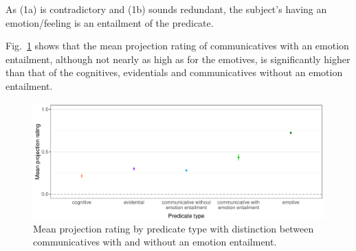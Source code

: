 \documentclass[11pt,fleqn]{article}
\newcommand{\figref}[1]{Fig.~\ref{#1}}
\newcommand{\6}{\mbox{$[\hspace*{-.6mm}[$}}
\newcommand{\9}{\mbox{$]\hspace*{-.6mm}]$}}
\begin{document}
\begin{exe}
	\ex
	\begin{xlist}
	\end{xlist}
\end{exe}
As (1a) is contradictory and (1b) sounds redundant, the subject’s having an emotion/feeling is an entailment of the predicate.

\figref{projpredtype2} shows that the mean projection rating of communicatives with an emotion entailment, although not nearly as high as for the emotives, is significantly higher than that of the cognitives, evidentials and communicatives without an emotion entailment.

\begin{figure}[H]
	\centering
	\includegraphics[width=1\textwidth]{projection-by-predicateType2}
	\caption{Mean projection rating by predicate type with distinction between communicatives with and without an emotion entailment.}
	\label{projpredtype2}
\end{figure}
\end{document}
